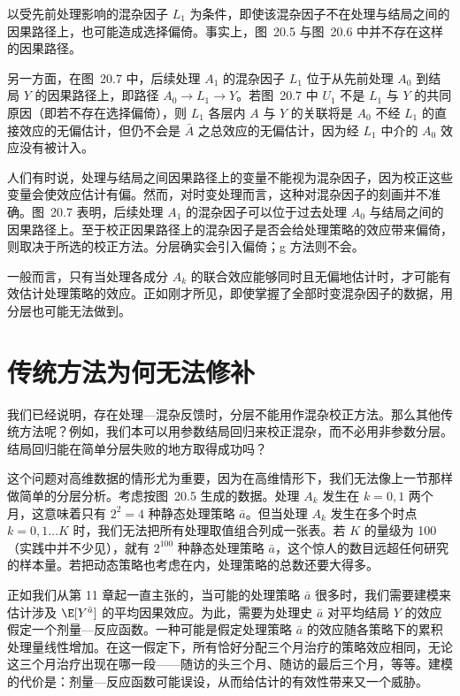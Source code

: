 \begin{finepoint}[因果路径上的混杂因子]
以受先前处理影响的混杂因子 $L_1$ 为条件，即使该混杂因子不在处理与结局之间的因果路径上，也可能造成选择偏倚。事实上，图~20.5 与图~20.6 中并不存在这样的因果路径。

另一方面，在图~20.7 中，后续处理 $A_1$ 的混杂因子 $L_1$ 位于从先前处理 $A_0$ 到结局 $Y$ 的因果路径上，即路径 $A_0\to L_1\to Y$。若图~20.7 中 $U_1$ 不是 $L_1$ 与 $Y$ 的共同原因（即若不存在选择偏倚），则 $L_1$ 各层内 $A$ 与 $Y$ 的关联将是 $A_0$ 不经 $L_1$ 的直接效应的无偏估计，但仍不会是 $\bar A$ 之总效应的无偏估计，因为经 $L_1$ 中介的 $A_0$ 效应没有被计入。

人们有时说，处理与结局之间因果路径上的变量不能视为混杂因子，因为校正这些变量会使效应估计有偏。然而，对时变处理而言，这种对混杂因子的刻画并不准确。图~20.7 表明，后续处理 $A_1$ 的混杂因子可以位于过去处理 $A_0$ 与结局之间的因果路径上。至于校正因果路径上的混杂因子是否会给处理策略的效应带来偏倚，则取决于所选的校正方法。分层确实会引入偏倚；g 方法则不会。
\end{finepoint}

一般而言，只有当处理各成分 $A_k$ 的联合效应能够同时且无偏地估计时，才可能有效估计处理策略的效应。正如刚才所见，即使掌握了全部时变混杂因子的数据，用分层也可能无法做到。

\section{传统方法为何无法修补}

我们已经说明，存在处理—混杂反馈时，分层不能用作混杂校正方法。那么其他传统方法呢？例如，我们本可以用参数结局回归来校正混杂，而不必用非参数分层。结局回归能在简单分层失败的地方取得成功吗？

这个问题对高维数据的情形尤为重要，因为在高维情形下，我们无法像上一节那样做简单的分层分析。考虑按图~20.5 生成的数据。处理 $A_k$ 发生在 $k=0,1$ 两个月，这意味着只有 $2^2=4$ 种静态处理策略 $\bar a$。但当处理 $A_k$ 发生在多个时点 $k=0,1\ldots K$ 时，我们无法把所有处理取值组合列成一张表。若 $K$ 的量级为 100（实践中并不少见），就有 $2^{100}$ 种静态处理策略 $\bar a$，这个惊人的数目远超任何研究的样本量。若把动态策略也考虑在内，处理策略的总数还要大得多。

正如我们从第 11 章起一直主张的，当可能的处理策略 $\bar a$ 很多时，我们需要建模来估计涉及 $\E[Y^{\bar a}]$ 的平均因果效应。为此，需要为处理史 $\bar a$ 对平均结局 $Y$ 的效应假定一个剂量—反应函数。一种可能是假定处理策略 $\bar a$ 的效应随各策略下的累积处理量线性增加。在这一假定下，所有恰好分配三个月治疗的策略效应相同，无论这三个月治疗出现在哪一段——随访的头三个月、随访的最后三个月，等等。建模的代价是：剂量—反应函数可能误设，从而给估计的有效性带来又一个威胁。

